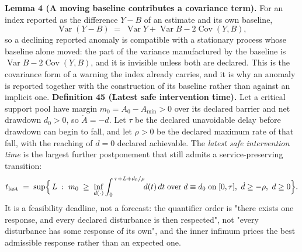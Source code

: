 \documentclass[11pt]{article}
\begin{document}
\textbf{Lemma 4 (A moving baseline contributes a covariance term).} For an index reported as the difference
\(Y - B\) of an estimate and its own baseline,
\[ \operatorname{Var}(Y - B) \;=\; \operatorname{Var} Y + \operatorname{Var} B - 2\operatorname{Cov}(Y, B) , \]
so a declining reported anomaly is compatible with a stationary process whose baseline alone moved: the part
of the variance manufactured by the baseline is \(\operatorname{Var} B - 2\operatorname{Cov}(Y, B)\), and it is
invisible unless both are declared. This is the covariance form of a warning the index already carries, and
it is why an anomaly is reported together with the construction of its baseline rather than against an
implicit one.
\textbf{Definition 45 (Latest safe intervention time).} Let a critical support pool have margin
\(m_0 = A_0 - A_{\min} > 0\) over its declared barrier and net drawdown \(d_0 > 0\), so \(\dot A = -d\).
Let \(\tau\) be the declared unavoidable delay before drawdown can begin to fall, and let \(\rho > 0\) be the
declared maximum rate of that fall, with the reaching of \(d = 0\) declared achievable. The \emph{latest safe
intervention time} is the largest further postponement that still admits a service-preserving transition:
\[ t_{\mathrm{last}} \;=\; \sup\Bigl\{\, L \;:\; m_0 \;\ge\; \inf_{d(\cdot)} \int_0^{\,\tau+L+d_0/\rho} \!\! d(t)\,dt \;\text{over}\; d \equiv d_0 \;\text{on}\; [0,\tau],\ \dot d \ge -\rho,\ d \ge 0 \Bigr\} . \]
It is a feasibility deadline, not a forecast: the quantifier order is "there exists one response, and every
declared disturbance is then respected", not "every disturbance has some response of its own", and the inner
infimum prices the best admissible response rather than an expected one.
\end{document}
